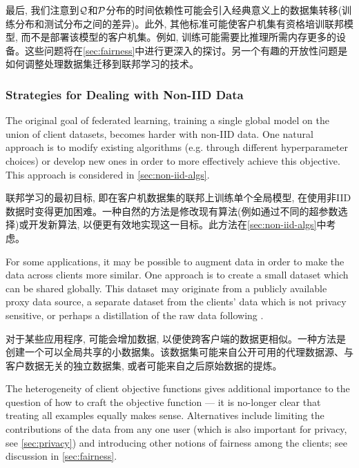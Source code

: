 最后, 我们注意到$\mathcal{Q}$和$\mathcal{P}$分布的时间依赖性可能会引入经典意义上的数据集转移(训练分布和测试分布之间的差异)。此外, 其他标准可能使客户机集有资格培训联邦模型, 而不是部署该模型的客户机集。例如, 训练可能需要比推理所需内存更多的设备。这些问题将在\cref{sec:fairness}中进行更深入的探讨。另一个有趣的开放性问题是如何调整处理数据集迁移到联邦学习的技术。


\subsubsection{Strategies for Dealing with Non-IID Data}

The original goal of federated learning, training a single global model on the union of client datasets, becomes harder with non-IID data. One natural approach is to modify existing algorithms (e.g. through different hyperparameter choices) or develop new ones in order to more effectively achieve this objective. This approach is considered in \cref{sec:non-iid-algs}.

联邦学习的最初目标, 即在客户机数据集的联邦上训练单个全局模型, 在使用非IID数据时变得更加困难。一种自然的方法是修改现有算法(例如通过不同的超参数选择)或开发新算法, 以便更有效地实现这一目标。此方法在\cref{sec:non-iid-algs}中考虑。


For some applications, it may be possible to augment data in order to make the data across clients more similar. One approach is to create a small dataset which can be shared globally. This dataset may originate from a publicly available proxy data source, a separate dataset from the clients’ data which is not privacy sensitive, or perhaps a distillation of the raw data following \citet{wang2018dataset}.



对于某些应用程序, 可能会增加数据, 以便使跨客户端的数据更相似。一种方法是创建一个可以全局共享的小数据集。该数据集可能来自公开可用的代理数据源、与客户数据无关的独立数据集, 或者可能来自\citet{wang2018dataset}之后原始数据的提炼。

The heterogeneity of client objective functions gives additional importance to the question of how to craft the objective function --- it is no-longer clear that treating all examples equally makes sense. Alternatives include limiting the contributions of the data from any one user (which is also important for privacy, see \cref{sec:privacy}) and introducing other notions of fairness among the clients; see discussion in \cref{sec:fairness}. 

